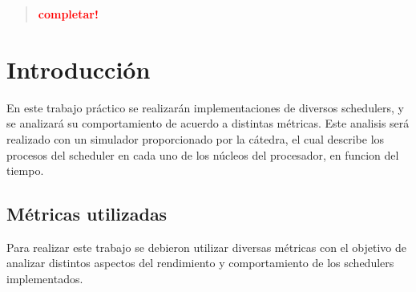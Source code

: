\documentclass[a4paper]{article}
\begin{document}

\thispagestyle{empty}

\maketitle
\newpage

\thispagestyle{empty}
\vfill
\begin{abstract}
    \vspace{0.5cm}
    \textcolor{red}{\textbf{completar!}}
\end{abstract}

\thispagestyle{empty}
\vspace{1.5cm}
\tableofcontents
\newpage


\newpage

\section{Introducción}
En este trabajo práctico se realizarán implementaciones de diversos
schedulers, y se analizará su comportamiento de acuerdo a distintas
métricas. Este analisis será realizado con un simulador proporcionado por la
cátedra, el cual describe los procesos del scheduler en cada uno de los
núcleos del procesador, en funcion del tiempo.

\subsection{Métricas utilizadas}
Para realizar este trabajo se debieron utilizar diversas métricas con el
objetivo de analizar distintos aspectos del rendimiento y comportamiento de
los schedulers implementados.
\end{document}
